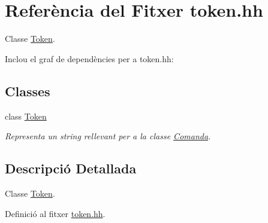 \hypertarget{token_8hh}{\section{Referència del Fitxer token.\-hh}
\label{token_8hh}
}


Classe \hyperlink{class_token}{Token}.  


Inclou el graf de dependències per a token.\-hh\-:
\subsection*{Classes}
\begin{DoxyCompactItemize}
\item 
class \hyperlink{class_token}{Token}
\begin{DoxyCompactList}\small\item\em Representa un string rellevant per a la classe \hyperlink{class_comanda}{Comanda}. \end{DoxyCompactList}\end{DoxyCompactItemize}


\subsection{Descripció Detallada}
Classe \hyperlink{class_token}{Token}. 

Definició al fitxer \hyperlink{token_8hh_source}{token.\-hh}.

